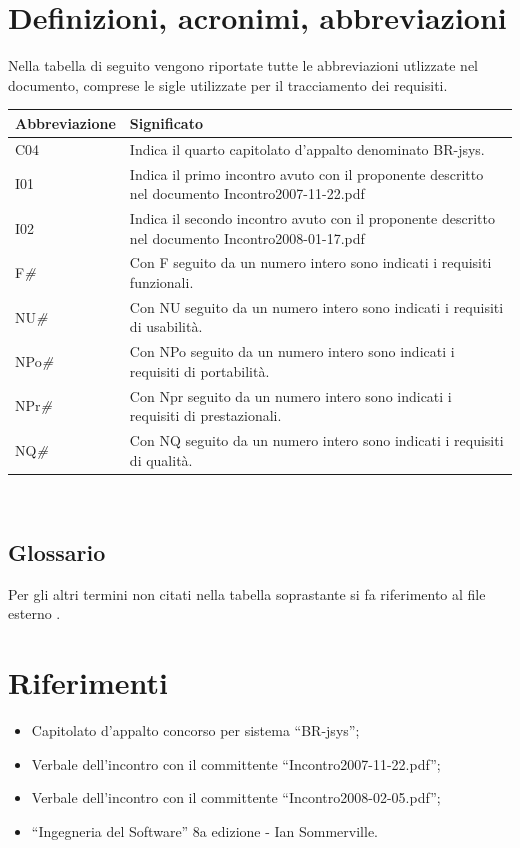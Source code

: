 \documentclass[11pt,titlepage,a4paper]{report}
\begin{document}
\section{Definizioni, acronimi, abbreviazioni}
Nella tabella di seguito vengono riportate tutte le abbreviazioni utlizzate nel documento, comprese le sigle utilizzate per il tracciamento dei requisiti.
\begin{center}
\begin{tabular}{||p{3.0cm}||p{8.5cm}||} \hline
\textbf{Abbreviazione} & \textbf{Significato} \\ \hline
C04 & Indica il quarto capitolato d'appalto denominato BR-jsys.\\ \hline
I01 & Indica il primo incontro avuto con il proponente descritto nel documento Incontro2007-11-22.pdf\\ \hline
I02 & Indica il secondo incontro avuto con il proponente descritto nel documento Incontro2008-01-17.pdf\\ \hline
F\textit{\#} & Con F seguito da un numero intero sono indicati i requisiti funzionali.\\ \hline
NU\textit{\#} & Con NU seguito da un numero intero sono indicati i requisiti di usabilit\`a.\\ \hline
NPo\textit{\#} & Con NPo seguito da un numero intero sono indicati i requisiti di portabilit\`a.\\ \hline
NPr\textit{\#} & Con Npr seguito da un numero intero sono indicati i requisiti di prestazionali.\\ \hline
NQ\textit{\#} & Con NQ seguito da un numero intero sono indicati i requisiti di qualit\`a.\\ \hline

\end{tabular} \\
\end{center}
\subsection{Glossario}
Per gli altri termini non citati nella tabella soprastante si fa riferimento al file esterno \Glossario .
\section{Riferimenti}
\begin{itemize}
\item Capitolato d'appalto concorso per sistema ``BR-jsys'';
\item Verbale dell'incontro con il committente ``Incontro2007-11-22.pdf'';
\item Verbale dell'incontro con il committente ``Incontro2008-02-05.pdf'';
\item ``Ingegneria del Software'' 8a edizione - Ian Sommerville.
\end{itemize}
\end{document}
